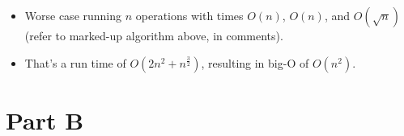 \documentclass[11pt]{article}
\begin{document}

\begin{itemize}
\item Worse case running $n$ operations with times $O(n)$, $O(n)$, and $O(\sqrt{n})$ (refer to marked-up algorithm above, in comments).

\item That's a run time of $O(2 n^2 + n^{\frac{3}{2}})$, resulting in big-O of $O(n^2)$.
\end{itemize}

\section*{Part B}
\end{document}
